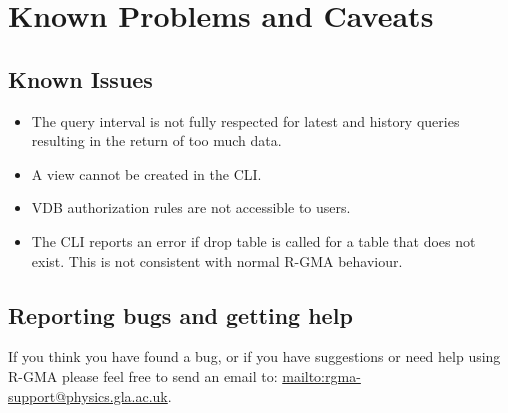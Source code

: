 \section{Known Problems and Caveats}

\subsection{Known Issues}

\begin{itemize} 

\item The query interval is not fully respected for latest and history queries
resulting in the return of too much data.

\item A view cannot be created in the CLI.

\item VDB authorization rules are not accessible to users.

\item The CLI reports an error if drop table is called for a table that does not
exist. This is not consistent with normal R-GMA behaviour.
\end{itemize}

\subsection{Reporting bugs and getting help}
If you think you have found a bug, or if you have suggestions or
need help using R-GMA please feel free to send an email to:
\url{mailto:rgma-support@physics.gla.ac.uk}.
